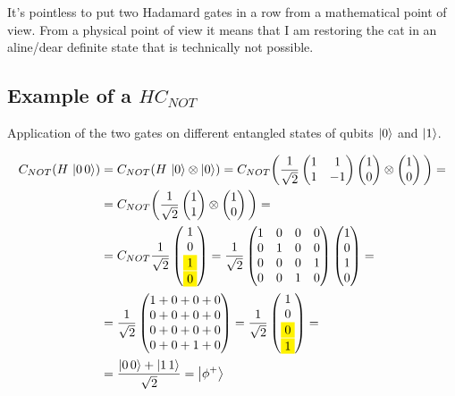 	It's pointless to put two Hadamard gates in a row from a mathematical point of view.
	From a physical point of view it means that I am restoring the cat in an aline/dear definite state that is technically not possible.

	\subsection{Example of a $HC_{NOT}$}
	Application of the two gates on different entangled states of qubits $\ket{0}$ and $\ket{1}$.

	\begin{align*}
		C_{NOT}(H\,\ket{0\,0})&=C_{NOT}(H\,\ket{0}\otimes\ket{0})=C_{NOT}\bigg(\frac{1}{\sqrt{2}}\begin{pmatrix}1&1\\1&-1\end{pmatrix}\begin{pmatrix}1\\0\end{pmatrix}\otimes\begin{pmatrix}1\\0\end{pmatrix}\bigg)=\\
													&=C_{NOT}\bigg(\frac{1}{\sqrt{2}}\begin{pmatrix}1\\1\end{pmatrix}\otimes\begin{pmatrix}1\\0\end{pmatrix}\bigg)=\\
													&=C_{NOT}\frac{1}{\sqrt{2}}\begin{pmatrix}1\\0\\\mathcolorbox{yellow}{1}\\\mathcolorbox{yellow}{0}\end{pmatrix}=\frac{1}{\sqrt{2}}\begin{pmatrix}1&0&0&0\\0&1&0&0\\0&0&0&1\\0&0&1&0\end{pmatrix}\begin{pmatrix}1\\0\\1\\0\end{pmatrix}=\\
													&=\frac{1}{\sqrt{2}}\begin{pmatrix}1+0+0+0\\0+0+0+0\\0+0+0+0\\0+0+1+0\end{pmatrix}=\frac{1}{\sqrt{2}}\begin{pmatrix}1\\0\\\mathcolorbox{yellow}{0}\\\mathcolorbox{yellow}{1}\end{pmatrix}=\\
													&=\frac{\ket{0\,0}+\ket{1\,1}}{\sqrt{2}}=\ket{\phi^+}
	\end{align*}
